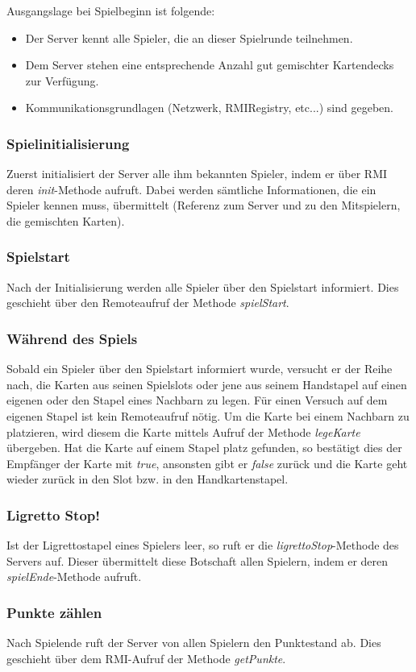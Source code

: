 Ausgangslage bei Spielbeginn ist folgende:
\begin{itemize}
	\item Der Server kennt alle Spieler, die an dieser Spielrunde teilnehmen.
	\item Dem Server stehen eine entsprechende Anzahl gut gemischter Kartendecks zur Verfügung.
	\item Kommunikationsgrundlagen (Netzwerk, RMIRegistry, etc...) sind gegeben.
\end{itemize}

\subsubsection{Spielinitialisierung}
Zuerst initialisiert der Server alle ihm bekannten Spieler, indem er über RMI deren \textit{init}-Methode aufruft. Dabei werden sämtliche Informationen, die ein Spieler kennen muss, übermittelt (Referenz zum Server und zu den Mitspielern, die gemischten Karten).

\subsubsection{Spielstart}
Nach der Initialisierung werden alle Spieler über den Spielstart informiert. Dies geschieht über den Remoteaufruf der Methode \textit{spielStart}.

\subsubsection{Während des Spiels}
Sobald ein Spieler über den Spielstart informiert wurde, versucht er der Reihe nach, die Karten aus seinen Spielslots oder jene aus seinem Handstapel auf einen eigenen oder den Stapel eines Nachbarn zu legen. Für einen Versuch auf dem eigenen Stapel ist kein Remoteaufruf nötig. Um die Karte bei einem Nachbarn zu platzieren, wird diesem die Karte mittels Aufruf der Methode \textit{legeKarte} übergeben. Hat die Karte auf einem Stapel platz gefunden, so bestätigt dies der Empfänger der Karte mit \textit{true}, ansonsten gibt er \textit{false} zurück und die Karte geht wieder zurück in den Slot bzw. in den Handkartenstapel.

\subsubsection{Ligretto Stop!}
Ist der Ligrettostapel eines Spielers leer, so ruft er die \textit{ligrettoStop}-Methode des Servers auf. Dieser übermittelt diese Botschaft allen Spielern, indem er deren \textit{spielEnde}-Methode aufruft.

\subsubsection{Punkte zählen}
Nach Spielende ruft der Server von allen Spielern den Punktestand ab. Dies geschieht über dem RMI-Aufruf der Methode \textit{getPunkte}.



